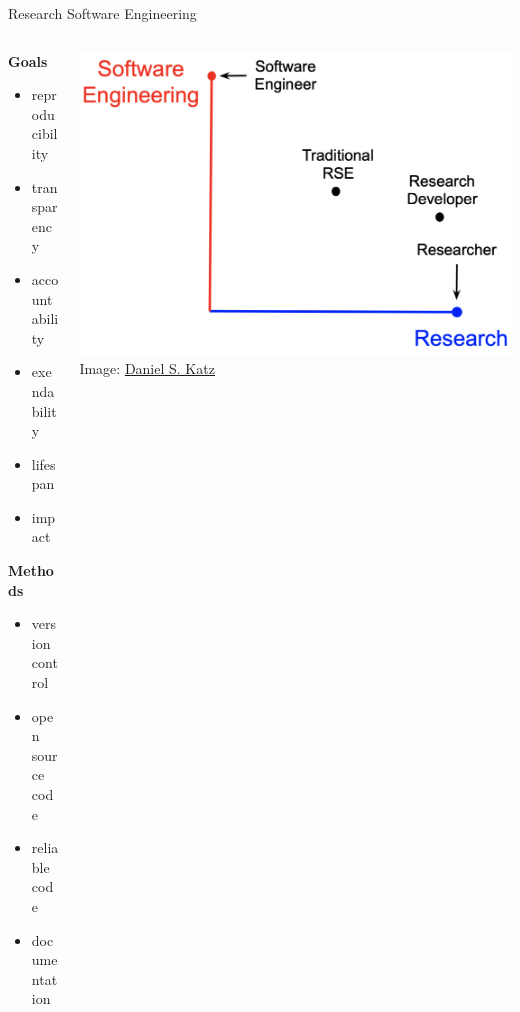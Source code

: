 \documentclass{beamer} %
\begin{document}
  \begin{frame}[label=RSE]{Research Software Engineering}
    \begin{columns}
      \begin{column}{0.4\textwidth}
        \textbf{Goals}
        \begin{itemize}
          \item reproducibility
          \item transparency
          \item accountability
          \item exendability
          \item lifespan
          \item impact
        \end{itemize}
        
        \textbf{Methods}
        \begin{itemize}
          \item version control
          \item open source code
          \item reliable code
          \item documentation
        \end{itemize}
      \end{column}

      \begin{column}{0.6\textwidth}
        \includegraphics[width=\textwidth]{RSE_graph_katz.png}
        \tiny{Image: \href{https://danielskatzblog.wordpress.com/2019/07/12/super-rses-combining-research-and-service-in-three-dimensions-of-research-software-engineering/}{\underline{Daniel S. Katz}}}
      \end{column}
  \end{columns}
  \end{frame}
\end{document}

